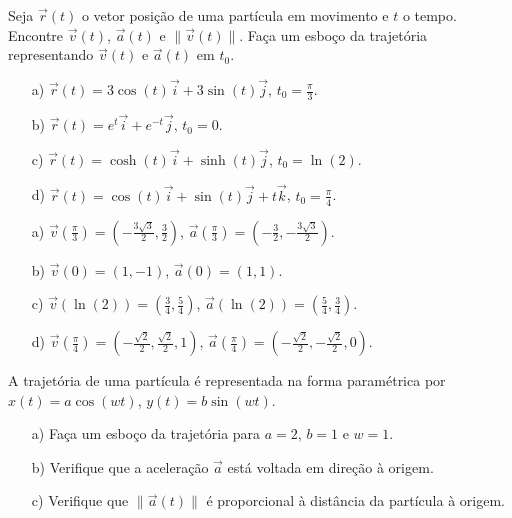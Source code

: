\begin{exer}
 Seja $\vec{r}(t)$ o vetor posição de uma partícula em movimento e $t$ o tempo. Encontre $\vec{v}(t)$, $\vec{a}(t)$ e $\|\vec{v}(t)\|$. Faça um esboço da trajetória representando $\vec{v}(t)$ e $\vec{a}(t)$ em $t_0$.
 \begin{itemize}
  \item[a)]$\vec{r}(t)=3\cos(t)\vec{i}+3\sin(t)\vec{j}$, $t_0=\frac{\pi}{3}$.
    \item[b)]$\vec{r}(t)=e^t\vec{i}+e^{-t}\vec{j}$, $t_0=0$.
    \item[c)]$\vec{r}(t)=\cosh(t)\vec{i}+\sinh(t)\vec{j}$, $t_0=\ln(2)$.
        \item[d)]$\vec{r}(t)=\cos(t)\vec{i}+\sin(t)\vec{j}+t\vec{k}$, $t_0=\frac{\pi}{4}$.
 \end{itemize}
\end{exer}
\begin{resp}
 \begin{itemize}
  \item[a)]$\vec{v}\left(\frac{\pi}{3}\right)=\left(-\frac{3\sqrt{3}}{2},\frac{3}{2}\right)$, $\vec{a}\left(\frac{\pi}{3}\right)=\left(-\frac{3}{2},-\frac{3\sqrt{3}}{2}\right)$.
  \item[b)]$\vec{v}\left(0\right)=\left(1,-1\right)$, $\vec{a}\left(0\right)=\left(1,1\right)$.
    \item[c)]$\vec{v}\left(\ln(2)\right)=\left(\frac{3}{4},\frac{5}{4}\right)$, $\vec{a}\left(\ln(2)\right)=\left(\frac{5}{4},\frac{3}{4}\right)$.
  \item[d)]$\vec{v}\left(\frac{\pi}{4}\right)=\left(-\frac{\sqrt{2}}{2},\frac{\sqrt{2}}{2},1\right)$, $\vec{a}\left(\frac{\pi}{4}\right)=\left(-\frac{\sqrt{2}}{2},-\frac{\sqrt{2}}{2},0\right)$.
 \end{itemize}
\end{resp}
\begin{exer}
 A trajetória de uma partícula é representada na forma paramétrica por $x(t)=a\cos(wt)$, $y(t)=b\sin(wt)$.
 \begin{itemize}
  \item[a)] Faça um esboço da trajetória para $a=2$, $b=1$ e $w=1$.
  \item[b)] Verifique que a aceleração $\vec{a}$ está voltada em direção à origem.
  \item[c)] Verifique que $\|\vec{a}(t)\|$ é proporcional à distância da partícula à origem.
 \end{itemize}
 \end{exer}

